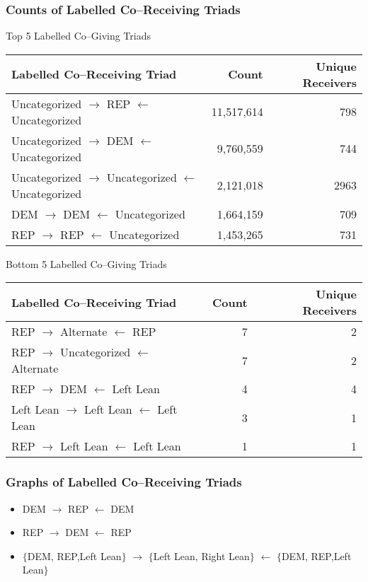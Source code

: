 \documentclass{beamer}
\begin{document}
\begin{frame}
\frametitle{Counts of Labelled Co--Receiving Triads}
\vspace{-0.3cm}
\scriptsize

\begin{table}[!htb]
\centering
Top 5 Labelled Co--Giving Triads
\begin{tabular}{lrr}
\toprule
               {\bf{Labelled Co--Receiving Triad}} &       {\bf{Count}} & {\bf{Unique Receivers}} \\
\midrule

Uncategorized $\rightarrow$ REP  $\leftarrow$ Uncategorized & 11,517,614 & 798\\
Uncategorized $\rightarrow$ DEM  $\leftarrow$ Uncategorized & 9,760,559 & 744\\
Uncategorized $\rightarrow$ Uncategorized  $\leftarrow$ Uncategorized & 2,121,018 & 2963\\
DEM $\rightarrow$ DEM  $\leftarrow$ Uncategorized & 1,664,159 & 709\\
REP $\rightarrow$ REP  $\leftarrow$ Uncategorized & 1,453,265 & 731\\
\bottomrule
\end{tabular}
\end{table}

\begin{table}[!htb]
\centering
Bottom 5 Labelled Co--Giving Triads
\begin{tabular}{lrr}
\toprule
               {\bf{Labelled Co--Receiving Triad}} &       {\bf{Count}} & {\bf{Unique Receivers}} \\
\midrule

REP  $\rightarrow$  Alternate $\leftarrow$ REP & 7 & 2\\
REP  $\rightarrow$  Uncategorized $\leftarrow$ Alternate & 7 & 2\\
REP  $\rightarrow$  DEM $\leftarrow$ Left Lean & 4 & 4\\
Left Lean $\rightarrow$ Left Lean $\leftarrow$ Left Lean & 3 & 1\\
REP  $\rightarrow$  Left Lean $\leftarrow$ Left Lean & 1 & 1\\
\bottomrule
\end{tabular}
\end{table}

\end{frame}




\begin{frame}
\frametitle{Graphs of Labelled Co--Receiving Triads}

\begin{center}
\Large
\begin{itemize}
\item DEM $\rightarrow$ REP $\leftarrow$ DEM
\item REP $\rightarrow$ DEM $\leftarrow$ REP
\item $\{$DEM, REP,Left Lean$\}$ $\rightarrow$ $\{$Left Lean, Right Lean$\}$ $\leftarrow$ $\{$DEM, REP,Left Lean$\}$
\end{itemize}
\end{center}

\end{frame}
\end{document}

